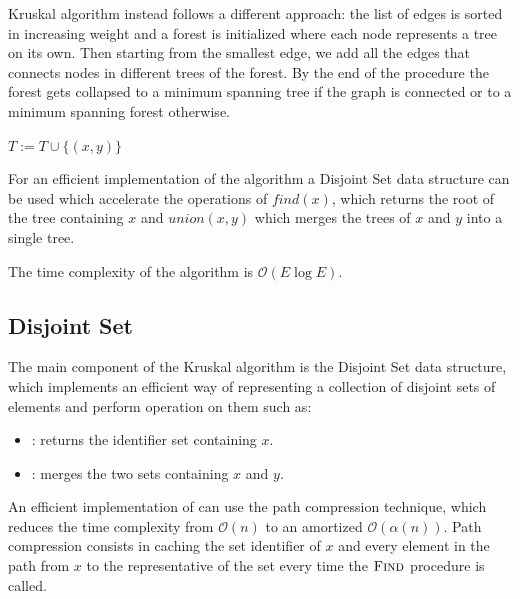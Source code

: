 \documentclass{article}
\begin{document}
Kruskal algorithm instead follows a different approach: the list of edges is sorted in increasing weight and a forest is initialized where each node represents a tree on its own. Then starting from the smallest edge, we add all the edges that connects nodes in different trees of the forest. By the end of the procedure the forest gets collapsed to a minimum spanning tree if the graph is connected or to a minimum spanning forest otherwise.

\begin{algorithm}
    \begin{algorithmic}
         
             
                    \State {}
                    \State $T := T \cup \{(x, y)\}$
                \EndIf
            \EndFor
        \EndFunction
    \end{algorithmic}
\end{algorithm}

For an efficient implementation of the algorithm a Disjoint Set data structure can be used which accelerate the operations of $find(x)$, which returns the root of the tree containing $x$ and $union(x, y)$ which merges the trees of $x$ and $y$ into a single tree.

The time complexity of the algorithm is $\mathcal{O}(E\log E)$.

\subsection{Disjoint Set}

The main component of the Kruskal algorithm is the Disjoint Set data structure, which implements an efficient way of representing a collection of disjoint sets of elements and perform operation on them such as:
\begin{itemize}
    \item {}: returns the identifier set containing $x$.
    \item {}: merges the two sets containing $x$ and $y$.
\end{itemize}

An efficient implementation of  can use the path compression technique, which reduces the time complexity from $\mathcal{O}(n)$ to an amortized $\mathcal{O}(\alpha(n))$. Path compression consists in caching the set identifier of $x$ and every element in the path from $x$ to the representative of the set every time the $\textproc{Find}$ procedure is called.
\end{document}
